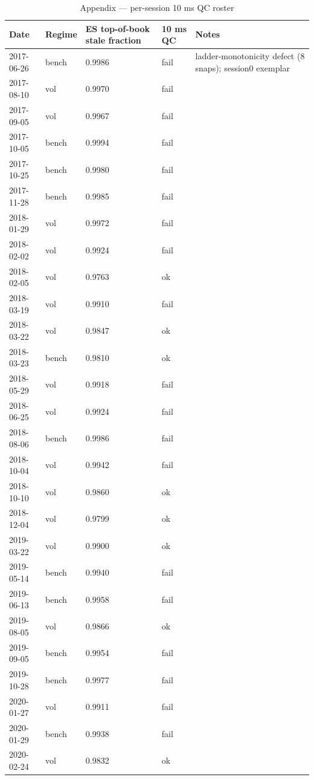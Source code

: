 \begin{table}[htbp]\centering
\caption{Appendix — per-session 10 ms QC roster}
\label{tab:a1}
\small
\begin{tabular}{lllll}
\toprule
Date & Regime & ES top-of-book stale fraction & 10 ms QC & Notes \\
\midrule
2017-06-26 & bench & 0.9986 & fail & ladder-monotonicity defect (8 snaps); session0 exemplar \\
2017-08-10 & vol & 0.9970 & fail &  \\
2017-09-05 & vol & 0.9967 & fail &  \\
2017-10-05 & bench & 0.9994 & fail &  \\
2017-10-25 & bench & 0.9980 & fail &  \\
2017-11-28 & bench & 0.9985 & fail &  \\
2018-01-29 & vol & 0.9972 & fail &  \\
2018-02-02 & vol & 0.9924 & fail &  \\
2018-02-05 & vol & 0.9763 & ok &  \\
2018-03-19 & vol & 0.9910 & fail &  \\
2018-03-22 & vol & 0.9847 & ok &  \\
2018-03-23 & bench & 0.9810 & ok &  \\
2018-05-29 & vol & 0.9918 & fail &  \\
2018-06-25 & vol & 0.9924 & fail &  \\
2018-08-06 & bench & 0.9986 & fail &  \\
2018-10-04 & vol & 0.9942 & fail &  \\
2018-10-10 & vol & 0.9860 & ok &  \\
2018-12-04 & vol & 0.9799 & ok &  \\
2019-03-22 & vol & 0.9900 & ok &  \\
2019-05-14 & bench & 0.9940 & fail &  \\
2019-06-13 & bench & 0.9958 & fail &  \\
2019-08-05 & vol & 0.9866 & ok &  \\
2019-09-05 & bench & 0.9954 & fail &  \\
2019-10-28 & bench & 0.9977 & fail &  \\
2020-01-27 & vol & 0.9911 & fail &  \\
2020-01-29 & bench & 0.9938 & fail &  \\
2020-02-24 & vol & 0.9832 & ok &  \\

\end{tabular}
\end{table}
